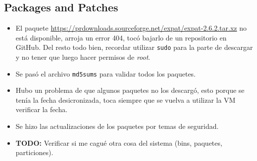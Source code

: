 \documentclass{article}
\begin{document}
\subsection{Packages and Patches}

\begin{itemize}
  \item El paquete \url{https://prdownloads.sourceforge.net/expat/expat-2.6.2.tar.xz} no está disponible, arroja un error 404, tocó bajarlo de un repositorio en GitHub. Del resto todo bien, recordar utilizar \texttt{sudo} para la parte de descargar y no tener que luego hacer permisos de \textit{root}.
  \item Se pasó el archivo \texttt{md5sums} para validar todos los paquetes.
  \item Hubo un problema de que algunos paquetes no los descargó, esto porque se tenía la fecha desicronizada, toca siempre que se vuelva a utilizar la VM verificar la fecha.
  \item Se hizo las actualizaciones de los paquetes por temas de seguridad.
  \item \textbf{TODO:} Verificar si me cagué otra cosa del sistema (bins, paquetes, particiones).

\end{itemize}
\end{document}

